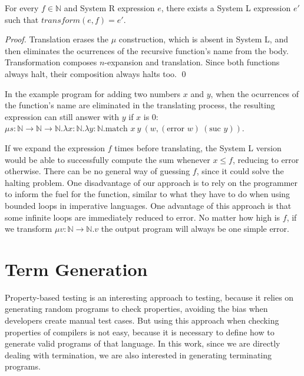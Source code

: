\documentclass[runningheads]{llncs}
\newcommand{\tN}{\mathbb{N}}
\begin{document}
\begin{theorem}\label{theo:hal}
For every $f \in \tN$ and System R expression $e$, there exists a System L expression $e'$ such that 
${\mathit{transform}(e, f) = e'}$.\end{theorem}
\begin{proof}
Translation erases the $\mu$ construction, 
which is absent in System L, and then 
eliminates the ocurrences of the recursive function's name from the body.
Transformation composes $n$-expansion and 
translation. Since both functions always 
halt, their composition always halts too. \qed
\end{proof} 

\noindent In the example program for adding two numbers 
$x$ and $y$, when the ocurrences of the function's name are eliminated in 
the translating process, the resulting expression can 
still answer with $y$ if $x$ is $0$:
$\mu s : \tN \rightarrow \tN \rightarrow \tN . \lambda x : \tN . \lambda y : \tN . \text{match } x \: y \: (w, (\text{error } w) \: (\text{suc } y))
$.

If we expand the expression $f$ times before 
translating, the System L version would be 
able to successfully compute the sum whenever 
$x \leq f$, reducing to error otherwise. 
There can be no general way of guessing $f$, 
since it could solve the halting problem. One 
disadvantage of our approach is to rely on 
the programmer to inform the fuel for the 
function, similar to what they have to do 
when using bounded loops in imperative 
languages. One advantage of this approach is 
that some infinite loops are immediately 
reduced to error. No matter how high is $f$, 
if we transform $\mu v : \tN \rightarrow \tN . v$ 
the output program will always be one simple 
error.

\section{Term Generation}
Property-based testing is an interesting approach to testing, 
because it relies on generating random programs to check 
properties, avoiding the bias when developers create 
manual test cases. But using this approach when checking 
properties of compilers is not easy, because it is necessary 
to define how to generate valid programs of that language.
In this work, since we are directly dealing with termination, 
we are also interested in generating terminating programs.
\end{document}
